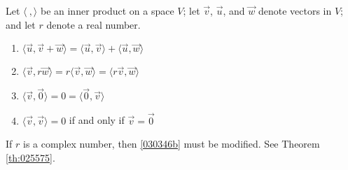 \documentclass{ximera}
\begin{document}
\begin{theorem}\label{thm:030346}
Let $\langle\ , \rangle$ be an inner product on a space $V$; let $\vec{v}$, $\vec{u}$, and $\vec{w}$ denote vectors in $V$; and let $r$ denote a real number.

\begin{enumerate}
\item\label{030346a} $\langle \vec{u}, \vec{v} + \vec{w}\rangle =
  \langle\vec{u}, \vec{v}\rangle + \langle\vec{u}, \vec{w}\rangle$

\item\label{030346b} $\langle\vec{v}, r\vec{w}\rangle =  r\langle\vec{v}, \vec{w}\rangle = \langle r\vec{v}, \vec{w}\rangle$

\item\label{030346c} $\langle\vec{v}, \vec{0}\rangle = 0 = \langle\vec{0}, \vec{v} \rangle $

\item\label{030346d} $\langle\vec{v}, \vec{v}\rangle = 0$ if and only if $\vec{v} = \vec{0}$

\end{enumerate}
\end{theorem}

\begin{remark}
    If $r$ is a complex number, then \ref{030346b} must be modified.  See Theorem \ref{th:025575}.
\end{remark}
\end{document}
